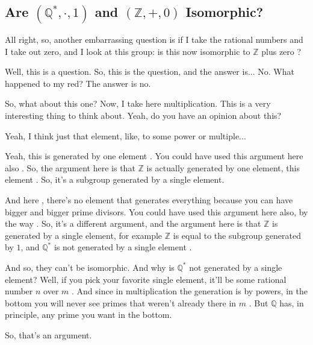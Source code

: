 \subsection{Are \texorpdfstring{$(\mathbb{Q}^*, \cdot, 1)$}{(Q*, *, 1)} and \texorpdfstring{$(\mathbb{Z}, +, 0)$}{(Z, +, 0)} Isomorphic?}

\begin{speech}[00:32:43 - 00:33:24]
All right, so, another embarrassing question is if I take the rational numbers and I take out zero, and I look at this group: is this now isomorphic to $\mathbb{Z}$ plus zero ?

Well, this is a question. So, this is the question, and the answer is... No. What happened to my red?  The answer is no.

So, what about this one? Now, I take here multiplication. This is a very interesting thing to think about. Yeah, do you have an opinion about this?
\end{speech}

\begin{student}
Yeah, I think  just that element, like, to some power or multiple...
\end{student}

\begin{speech}[00:33:29 - 00:34:44]
Yeah, this is generated by one element . You could have used this argument here also . So, the argument here is that $\mathbb{Z}$ is actually generated by one element, this element . So, it's a subgroup generated by a single element.

And here , there's no element that generates everything because you can have bigger and bigger prime divisors. You could have used this argument here also, by the way . So, it's a different argument, and the argument here is that $\mathbb{Z}$ is generated by a single element, for example $\mathbb{Z}$ is equal to the subgroup generated by $1$, and $\mathbb{Q}^*$ is not generated by a single element .

And so, they can't be isomorphic. And why is $\mathbb{Q}^*$ not generated by a single element? Well, if you pick your favorite single element, it'll be some rational number $n$ over $m$ . And since in multiplication the generation is by powers, in the bottom you will never see primes that weren't already there in $m$ . But $\mathbb{Q}$ has, in principle, any prime you want in the bottom.

So, that's an argument.
\end{speech}

